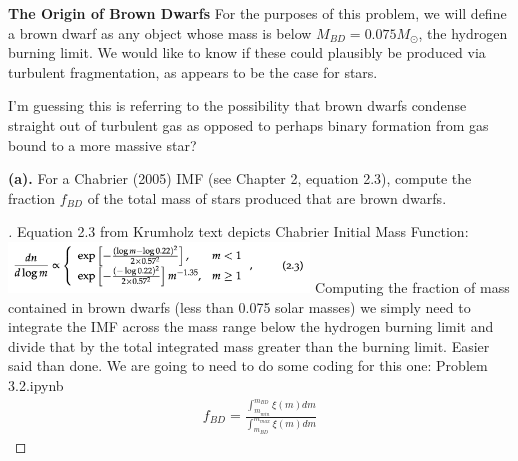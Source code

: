 \documentclass[10pt]{article}
\newenvironment{problem}[2][Problem]{\begin{trivlist}
\item[\hskip \labelsep {\bfseries #1}\hskip \labelsep {\bfseries #2.}]}{\end{trivlist}}
\begin{document}
\begin{problem}{3.2}
\textbf{The Origin of Brown Dwarfs}
For the purposes of this problem, we will define a brown dwarf as any object whose mass is below $M_{BD} = 0.075 M_{\odot}$, the hydrogen burning limit. We would like to know if these could plausibly be produced via turbulent fragmentation, as appears to be the case for stars.

I'm guessing this is referring to the possibility that brown dwarfs condense straight out of turbulent gas as opposed to perhaps binary formation from gas bound to a more massive star?
\end{problem}
\noindent\textbf{(a).}
For a Chabrier (2005) IMF (see Chapter 2, equation 2.3), compute the fraction $f_{BD}$ of the total mass of stars produced that are brown dwarfs.
\begin{proof}[]

Equation 2.3 from Krumholz text depicts Chabrier Initial Mass Function:
\newline
\includegraphics[width=8cm]{./figures/Chabrier05.png}
\newline
Computing the fraction of mass contained in brown dwarfs (less than 0.075 solar masses) we simply need to integrate the IMF across the mass range below the hydrogen burning limit and divide that by the total integrated mass greater than the burning limit. Easier said than done. We are going to need to do some coding for this one: Problem 3.2.ipynb
\begin{align}
f_{BD} = \frac{\int_{m_{min}}^{m_{BD}} \xi(m) dm}{\int_{m_{BD}}^{m_{max}} \xi(m) dm}
\end{align}
\end{proof}
\end{document}
